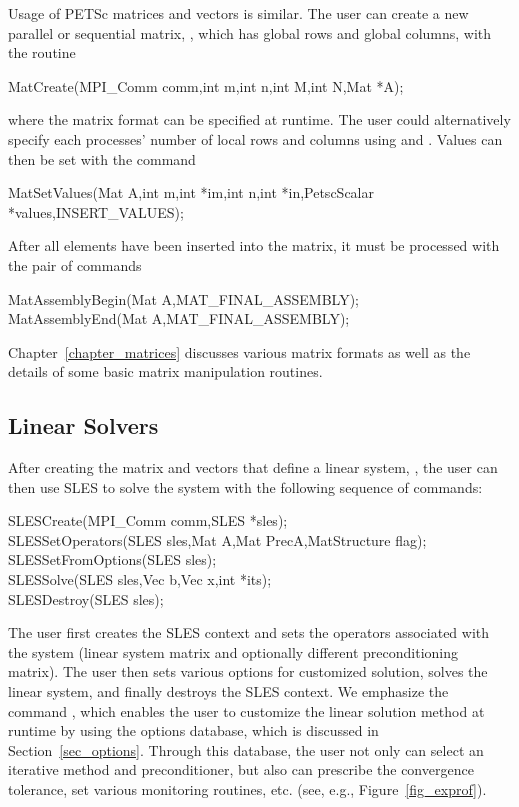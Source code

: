 Usage of PETSc matrices and vectors is similar.  
The user can create a new parallel or sequential matrix, , which
has  global rows and  global columns, with the routine
\begin{tabbing}
  MatCreate(MPI\_Comm comm,int m,int n,int M,int N,Mat *A);
\end{tabbing}
where the matrix format can be specified at runtime.  The user could
alternatively specify each processes' number of local rows and columns
using  and .
Values can then be set with the command
\begin{tabbing}
  MatSetValues(Mat A,int m,int *im,int n,int *in,PetscScalar *values,INSERT\_VALUES);
\end{tabbing}
After  all elements have been inserted into the
matrix, it must be processed with the pair of commands
 
\begin{tabbing}
  MatAssemblyBegin(Mat A,MAT\_FINAL\_ASSEMBLY);\\
  MatAssemblyEnd(Mat A,MAT\_FINAL\_ASSEMBLY);
\end{tabbing}
Chapter~\ref{chapter_matrices} discusses various matrix formats as
well as the details of some basic matrix manipulation routines.

\subsection*{Linear Solvers}

After creating the matrix and vectors that define a linear system,
, the user can then use SLES to solve the system 
with the following sequence of commands: 
 
  
\begin{tabbing}
  SLESCreate(MPI\_Comm comm,SLES *sles); \\
  SLESSetOperators(SLES sles,Mat A,Mat PrecA,MatStructure flag);\\
  SLESSetFromOptions(SLES sles);\\
  SLESSolve(SLES sles,Vec b,Vec x,int *its);\\
  SLESDestroy(SLES sles);
\end{tabbing}
The user first creates the SLES context and sets the operators
associated with the system (linear system matrix and optionally different
preconditioning matrix).  The user then sets various options for
customized solution, solves the linear system, and finally destroys
the SLES context.  We emphasize the command , 
which enables the user to customize the linear solution
method at runtime by using the options database, which is discussed in
Section~\ref{sec_options}. Through this database, the user not only
can select an iterative method and preconditioner, but also can prescribe
the convergence tolerance, set various monitoring routines, etc.
(see, e.g., Figure~\ref{fig_exprof}).

